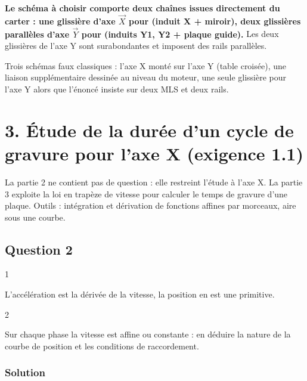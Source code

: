 \documentclass[11pt,a4paper]{article}
\begin{document}
\textbf{Le schéma à choisir comporte deux chaînes issues directement du carter : une glissière d'axe \(\vec X\) pour (induit X + miroir), deux glissières parallèles d'axe \(\vec Y\) pour (induits Y1, Y2 + plaque guide).} Les deux glissières de l'axe Y sont surabondantes et imposent des rails parallèles.

\begin{piege}

Trois schémas faux classiques : l'axe X monté sur l'axe Y (table croisée), une liaison supplémentaire dessinée au niveau du moteur, une seule glissière pour l'axe Y alors que l'énoncé insiste sur deux MLS et deux rails.

\end{piege}

\hypertarget{uxe9tude-de-la-duruxe9e-dun-cycle-de-gravure-pour-laxe-x-exigence-1.1}{%
\section{3. Étude de la durée d'un cycle de gravure pour l'axe X (exigence 1.1)}\label{uxe9tude-de-la-duruxe9e-dun-cycle-de-gravure-pour-laxe-x-exigence-1.1}}

La partie 2 ne contient pas de question : elle restreint l'étude à l'axe X. La partie 3 exploite la loi en trapèze de vitesse pour calculer le temps de gravure d'une plaque. Outils : intégration et dérivation de fonctions affines par morceaux, aire sous une courbe.

\hypertarget{question-2}{%
\subsection{Question 2}\label{question-2}}

\begin{indication}{1}

L'accélération est la dérivée de la vitesse, la position en est une primitive.

\end{indication}

\begin{indication}{2}

Sur chaque phase la vitesse est affine ou constante : en déduire la nature de la courbe de position et les conditions de raccordement.

\end{indication}

\hypertarget{solution-1}{%
\subsubsection{Solution}\label{solution-1}}
\end{document}
